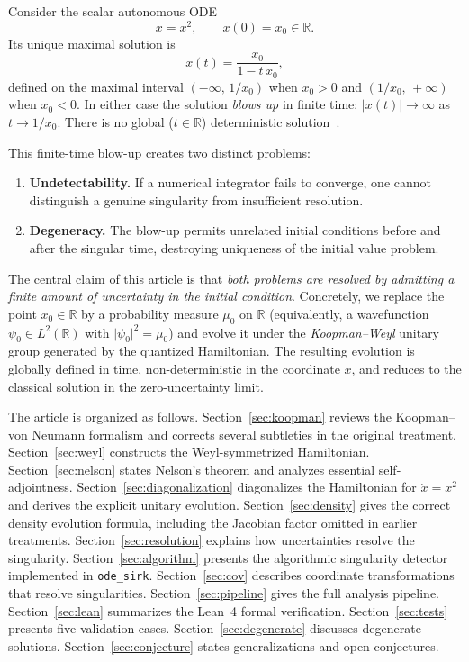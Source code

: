 \documentclass[11pt,a4paper]{article}
\newcommand{\Rset}{\mathbb{R}}
\begin{document}
Consider the scalar autonomous ODE
\begin{equation}\label{eq:ode}
  \dot{x}=x^{2},\qquad x(0)=x_{0}\in\Rset.
\end{equation}
Its unique maximal solution is
\begin{equation}\label{eq:classical-sol}
  x(t)=\frac{x_{0}}{1-t\,x_{0}},
\end{equation}
defined on the maximal interval $(-\infty,\,1/x_{0})$ when $x_{0}>0$ and
$(1/x_{0},\,+\infty)$ when $x_{0}<0$.  In either case the solution
\emph{blows up} in finite time: $\lvert x(t)\rvert\to\infty$ as
$t\to 1/x_{0}$.  There is no global ($t\in\Rset$) deterministic
solution~\cite{GORIELY2000422}.

This finite-time blow-up creates two distinct problems:
\begin{enumerate}
  \item \textbf{Undetectability.}  If a numerical integrator fails to
    converge, one cannot distinguish a genuine singularity from
    insufficient resolution.
  \item \textbf{Degeneracy.}  The blow-up permits unrelated initial
    conditions before and after the singular time, destroying uniqueness
    of the initial value problem.
\end{enumerate}

The central claim of this article is that \emph{both problems are resolved
by admitting a finite amount of uncertainty in the initial condition}.
Concretely, we replace the point $x_{0}\in\Rset$ by a probability measure
$\mu_{0}$ on $\Rset$ (equivalently, a wavefunction
$\psi_{0}\in L^{2}(\Rset)$ with $\lvert\psi_{0}\rvert^{2}=\mu_{0}$) and
evolve it under the \emph{Koopman--Weyl} unitary group generated by the
quantized Hamiltonian.  The resulting evolution is globally defined in
time, non-deterministic in the coordinate $x$, and reduces to the
classical solution in the zero-uncertainty limit.

The article is organized as follows.
Section~\ref{sec:koopman} reviews the Koopman--von Neumann formalism and
corrects several subtleties in the original treatment.
Section~\ref{sec:weyl} constructs the Weyl-symmetrized Hamiltonian.
Section~\ref{sec:nelson} states Nelson's theorem and analyzes essential
self-adjointness.
Section~\ref{sec:diagonalization} diagonalizes the Hamiltonian for
$\dot{x}=x^{2}$ and derives the explicit unitary evolution.
Section~\ref{sec:density} gives the correct density evolution formula,
including the Jacobian factor omitted in earlier treatments.
Section~\ref{sec:resolution} explains how uncertainties resolve the
singularity.
Section~\ref{sec:algorithm} presents the algorithmic singularity detector
implemented in \texttt{ode\_sirk}.
Section~\ref{sec:cov} describes coordinate transformations that resolve
singularities.
Section~\ref{sec:pipeline} gives the full analysis pipeline.
Section~\ref{sec:lean} summarizes the Lean~4 formal verification.
Section~\ref{sec:tests} presents five validation cases.
Section~\ref{sec:degenerate} discusses degenerate solutions.
Section~\ref{sec:conjecture} states generalizations and open conjectures.
\end{document}
